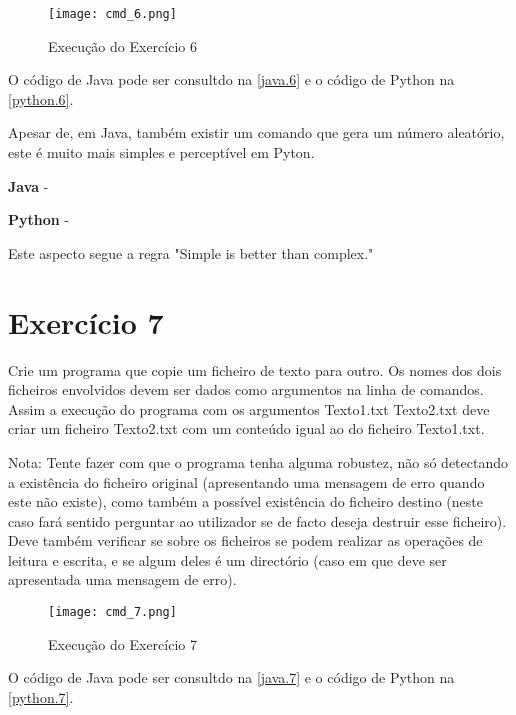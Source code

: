\documentclass[a4paper]{report}
\begin{document}
\begin{figure}[ht]
 \texttt{[image: cmd\_6.png]}
 \caption{Execução do Exercício 6}
 \label{cmd6}
\end{figure}


O código de Java pode ser consultdo na \autoref{java.6} e o código de Python na \autoref{python.6}.

Apesar de, em Java, também existir um comando que gera um número aleatório, este é muito mais simples e perceptível em Pyton.
\begin{description}
    \item \textbf{Java} - 
    \item \textbf{Python} - 
\end{description}

Este aspecto segue a regra "\gls{Simple is better than complex}."

\clearpage

\section{Exercício 7}
\label{exercicio7}
Crie um programa que copie um ficheiro de texto para outro. Os nomes dos dois ficheiros envolvidos devem ser dados como argumentos na linha de comandos. Assim a execução do programa com os argumentos Texto1.txt Texto2.txt deve criar um ficheiro Texto2.txt com um conteúdo igual ao do ficheiro Texto1.txt.


Nota: Tente fazer com que o programa tenha alguma robustez, não só detectando a existência do ficheiro original (apresentando uma mensagem de erro quando este não existe), como também a possível existência do ficheiro destino (neste caso fará sentido perguntar ao utilizador se de facto deseja destruir esse ficheiro). Deve também verificar se sobre os ficheiros se podem realizar as operações de leitura e escrita, e se algum deles é um directório (caso em que deve ser apresentada uma mensagem de erro).


\begin{figure}[ht]
 \texttt{[image: cmd\_7.png]}
 \caption{Execução do Exercício 7}
 \label{cmd7}
\end{figure}


O código de Java pode ser consultdo na \autoref{java.7} e o código de Python na \autoref{python.7}.
\end{document}
